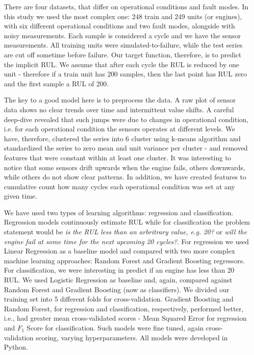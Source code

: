 \documentclass[letterpaper, 10 pt, conference, onecolumn]{ieeeconf}  %
\begin{document}
There are four datasets, that differ on operational conditions and fault modes. In this study we used the most complex one: 248 train and 249 units (or engines), with six different operational conditions and two fault modes, alongside with noisy measurements. Each sample is considered a cycle and we have the sensor measurements. All training units were simulated-to-failure, while the test series are cut off sometime before failure. Our target function, therefore, is to predict the implicit RUL. We assume that after each cycle the RUL is reduced by one unit - therefore if a train unit has 200 samples, then the last point has RUL zero and the first sample a RUL of 200.

The key to a good model here is to preprocess the data. A raw plot of sensor data shows no clear trends over time and intermittent value shifts. A careful deep-dive revealed that such jumps were due to changes in operational condition, i.e. for each operational condition the sensors operates at different levels. We have, therefore, clustered the series into 6 cluster using k-means algorithm and standardized the series to zero mean and unit variance per cluster - and removed features that were constant within at least one cluster. It was interesting to notice that some sensors drift upwards when the engine fails, others downwards, while others do not show clear patterns. In addition, we have created features to cumulative count how many cycles each operational condition was set at any given time.

We have used two types of learning algorithms: regression and classification. Regression models continuously estimate RUL while for classification the problem statement would be \textit{is the RUL less than an arbritrary value, e.g. 20?} or \textit{will the engine fail at some time for the next upcoming 20 cycles?}. For regression we used Linear Regression as a baseline model and compared with two more complex machine learning approaches: Random Forest and Gradient Boosting regressors. For classification, we were interesting in predict if an engine has less than 20 RUL. We used Logistic Regression as baseline and, again, compared against Random Forest and Gradient Boosting (now as classifiers). We divided our training set into 5 different folds for cross-validation. Gradient Boosting and Random Forest, for regression and classification, respectively, performed better, i.e., had greater mean cross-validated scores - Mean Squared Error for regression and $F_1$ Score for classification. Such models were fine tuned, again cross-validation scoring, varying hyperparameters. All models were developed in Python.
\end{document}
